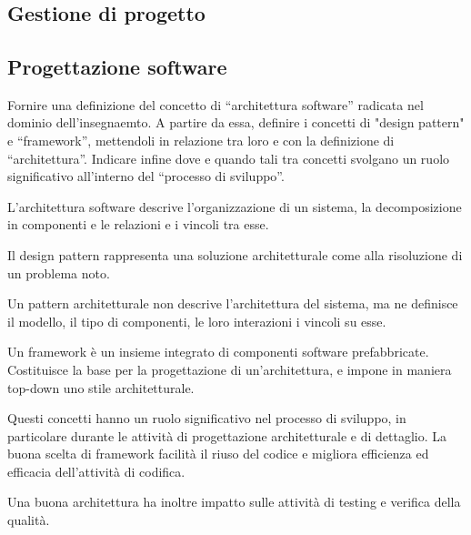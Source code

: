 \section{}

\subsection{Gestione di progetto}

\subsection{Progettazione software}

\begin{question}
  Fornire una definizione del concetto di ``architettura software'' radicata nel
  dominio dell'insegnaemto. A partire da essa, definire i concetti di "design
  pattern" e ``framework'', mettendoli in relazione tra loro e con la
  definizione di ``architettura''. Indicare infine dove e quando tali tra concetti
  svolgano un ruolo significativo all'interno del ``processo di sviluppo''.
\end{question}

L'architettura software descrive l'organizzazione di un sistema, la
decomposizione in componenti e le relazioni e i vincoli tra esse.

Il design pattern rappresenta una soluzione architetturale come
 alla risoluzione di un problema noto.

Un pattern architetturale non descrive l'architettura del sistema, ma ne
definisce il modello, il tipo di componenti, le loro interazioni i vincoli su
esse.

Un framework è un insieme integrato di componenti software prefabbricate.
Costituisce la base per la progettazione  di
un'architettura, e impone in maniera top-down uno stile architetturale.

Questi concetti hanno un ruolo significativo nel processo di sviluppo, in
particolare durante le attività di progettazione architetturale e di dettaglio.
La buona scelta di framework facilità il riuso del codice e migliora
efficienza ed efficacia dell'attività di codifica.

Una buona architettura ha inoltre impatto sulle attività di testing e verifica
della qualità.
